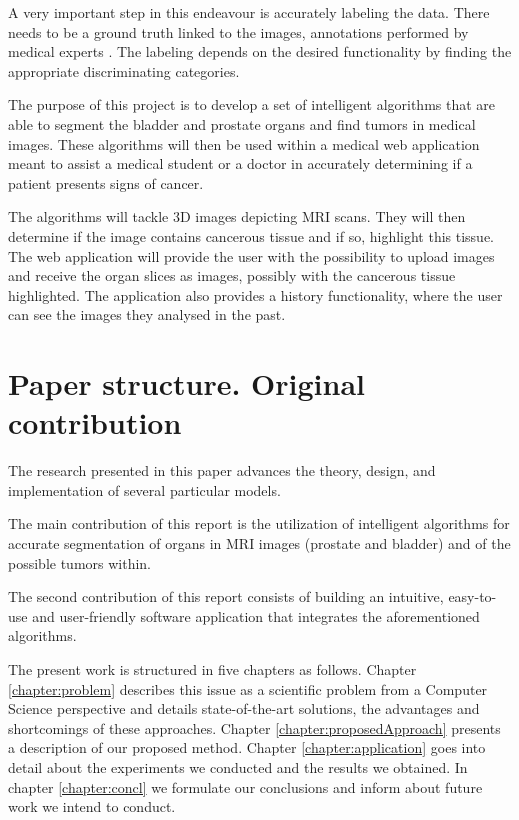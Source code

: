 \documentclass[runningheads,a4paper,11pt]{report}
\begin{document}
A very important step in this endeavour is accurately labeling the data. There needs to be a ground truth linked to the images, annotations performed by medical experts \cite{willemink2020preparing}. The labeling depends on the desired functionality by finding the appropriate discriminating categories. 

The purpose of this project is to develop a set of intelligent algorithms that are able to segment the bladder and prostate organs and find tumors in medical images. These algorithms will then be used within a medical web application meant to assist a medical student or a doctor in accurately determining if a patient presents signs of cancer.

The algorithms will tackle 3D images depicting MRI scans. They will then determine if the image contains cancerous tissue and if so, highlight this tissue. The web application will provide the user with the possibility to upload images and receive the organ slices as images, possibly with the cancerous tissue highlighted. The application also provides a history functionality, where the user can see the images they analysed in the past.

\section{Paper structure. Original contribution}
\label{section:structure}

The research presented in this paper advances the theory, design, and implementation of several particular models. 
 
The main contribution of this report is the utilization of intelligent algorithms for accurate segmentation of organs in MRI images (prostate and bladder) and of the possible tumors within.

The second contribution of this report consists of building an intuitive, easy-to-use and user-friendly software application that integrates the aforementioned algorithms.

The present work is structured in five chapters as follows. Chapter \ref{chapter:problem} describes this issue as a scientific problem from a Computer Science perspective and details state-of-the-art solutions, the advantages and shortcomings of these approaches. Chapter \ref{chapter:proposedApproach} presents a description of our proposed method. Chapter \ref{chapter:application} goes into detail about the experiments we conducted and the results we obtained. In chapter \ref{chapter:concl} we formulate our conclusions and inform about future work we intend to conduct.
\end{document}
